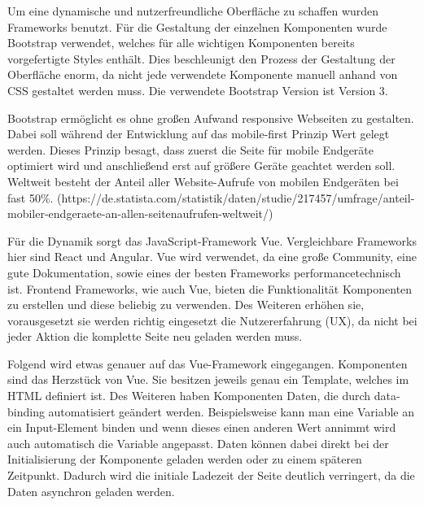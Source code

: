Um eine dynamische und nutzerfreundliche Oberfläche zu schaffen wurden Frameworks benutzt. Für die Gestaltung der einzelnen Komponenten wurde Bootstrap verwendet, welches für alle wichtigen Komponenten bereits vorgefertigte Styles enthält. Dies beschleunigt den Prozess der Gestaltung der Oberfläche enorm, da nicht jede verwendete Komponente manuell anhand von CSS gestaltet werden muss. Die verwendete Bootstrap Version ist Version 3.

Bootstrap ermöglicht es ohne großen Aufwand responsive Webseiten zu gestalten. Dabei soll während der Entwicklung auf das mobile-first Prinzip Wert gelegt werden. Dieses Prinzip besagt, dass zuerst die Seite für mobile Endgeräte optimiert wird und anschließend erst auf größere Geräte geachtet werden soll. Weltweit besteht der Anteil aller Website-Aufrufe von mobilen Endgeräten bei fast 50\%. (https://de.statista.com/statistik/daten/studie/217457/umfrage/anteil-mobiler-endgeraete-an-allen-seitenaufrufen-weltweit/) 

Für die Dynamik sorgt das JavaScript-Framework Vue. Vergleichbare Frameworks hier sind React und Angular. Vue wird verwendet, da eine große Community, eine gute Dokumentation, sowie eines der besten Frameworks performancetechnisch ist. %
Frontend Frameworks, wie auch Vue, bieten die Funktionalität Komponenten zu erstellen und diese beliebig zu verwenden. Des Weiteren erhöhen sie, vorausgesetzt sie werden richtig eingesetzt die Nutzererfahrung (UX), da nicht bei jeder Aktion die komplette Seite neu geladen werden muss.

Folgend wird etwas genauer auf das Vue-Framework eingegangen. Komponenten sind das Herzstück von Vue. Sie besitzen jeweils genau ein Template, welches im HTML definiert ist. Des Weiteren haben Komponenten Daten, die durch data-binding automatisiert geändert werden. Beispielsweise kann man eine Variable an ein Input-Element binden und wenn dieses einen anderen Wert annimmt wird auch automatisch die Variable angepasst. Daten können dabei direkt bei der Initialisierung der Komponente geladen werden oder zu einem späteren Zeitpunkt. Dadurch wird die initiale Ladezeit der Seite deutlich verringert, da die Daten asynchron geladen werden.
